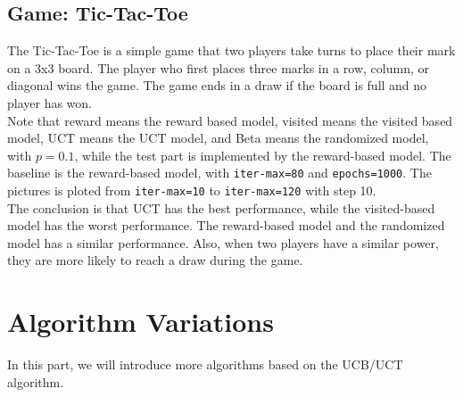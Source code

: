 \documentclass[11pt]{article}
\begin{document}
\subsection{Game: Tic-Tac-Toe}
The Tic-Tac-Toe is a simple game that two players take turns to place their mark on a 3x3 board. The player who first places three marks in a row, column, or diagonal wins the game. The game ends in a draw if the board is full and no player has won.\\
Note that reward means the reward based model, visited means the visited based model, UCT means the UCT model, and Beta means the randomized model, with $p=0.1$, while the test part is implemented by the reward-based model.
The baseline is the reward-based model, with \texttt{iter-max=80} and \texttt{epochs=1000}. The pictures is ploted from \texttt{iter-max=10} to \texttt{iter-max=120} with step 10.\\
The conclusion is that UCT has the best performance, while the visited-based model has the worst performance. The reward-based model and the randomized model has a similar performance. Also, when two players have a similar power, they are more likely to reach a draw during the game.\\
\section{Algorithm Variations}
In this part, we will introduce more algorithms based on the UCB/UCT algorithm.\\
\end{document}
